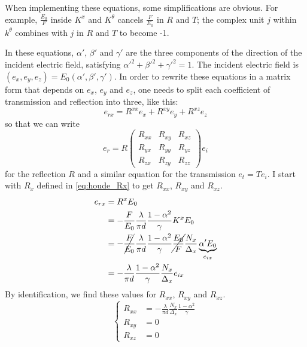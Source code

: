 When implementing these equations, some simplifications are obvious.
For example, $\frac{E_0}{F}$ inside $K^x$ and $K^\theta$ cancels $\frac{F}{E_0}$ in $R$ and $T$;
the complex unit $j$ within $k^\theta$ combines with $j$ in $R$ and $T$ to become -1.

In these equations, $\alpha'$, $\beta'$ and $\gamma'$ are the three components of the direction of the incident electric field, satisfying $\alpha'^2 + \beta'^2 + \gamma'^2 = 1$.
The incident electric field is $(e_x, e_y, e_z) = E_0(\alpha', \beta', \gamma')$.
In order to rewrite these equations in a matrix form that depends on $e_x$, $e_y$ and $e_z$, one needs to split each coefficient of transmission and reflection into three, like this:
\begin{equation}
    e_{rx} = R^{xx} e_x + R^{xy} e_y + R^{xz} e_z
\end{equation}
so that we can write
\begin{equation}
    e_r = R 
    \begin{pmatrix}
        R_{xx} & R_{xy} & R_{xz} \\
        R_{yx} & R_{yy} & R_{yz} \\
        R_{zx} & R_{zy} & R_{zz}
    \end{pmatrix}
    e_i
\end{equation}
for the reflection $R$ and a similar equation for the transmission $e_t = T e_i$.
I start with $R_x$ defined in \cref{eq:houde_Rx} to get $R_{xx}$, $R_{xy}$ and $R_{xz}$.
\begin{align*}
    e_{rx} &= R^x E_0
    \\
           &= -\frac{F}{E_0}
              \frac{\lambda}{\pi d}
              \frac{1-\alpha^2}{\gamma}
              K^x
              E_0
    \\
           &= -\cancel{\frac{F}{E_0}}
              \frac{\lambda}{\pi d}
              \frac{1-\alpha^2}{\gamma}
              \cancel{\frac{E_0}{F}}
              \frac{N_x}{\Delta_x}
              \underbrace{
                  \alpha'
                  E_0
              }_{e_{ix}}
    \\
           &= -\frac{\lambda}{\pi d}
              \frac{1-\alpha^2}{\gamma}
              \frac{N_x}{\Delta_x}
              e_{ix}
\end{align*}
By identification, we find these values for $R_{xx}$, $R_{xy}$ and $R_{xz}$.
\begin{equation}
    \left\lbrace
    \begin{aligned}
        R_{xx} &= -\frac{\lambda}{\pi d}
                  \frac{N_x}{\Delta_x}
                  \frac{1-\alpha^2}{\gamma}
        \\
        R_{xy} &= 0
        \\
        R_{xz} &= 0
    \end{aligned}
    \right.
\end{equation}
